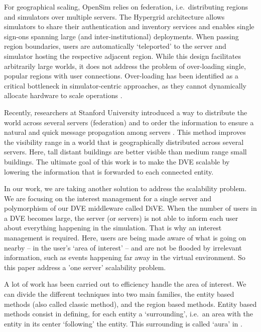 \documentclass[]{elsarticle}
\begin{document}
For geographical scaling, OpenSim relies on federation, i.e.~distributing regions and simulators over multiple servers. The Hypergrid architecture \cite{Lopes.2011} allows simulators to share their authentication and inventory services and enables single sign-ons spanning large (and inter-institutional) deployments. When passing region boundaries, users are automatically `teleported' to the server and simulator hosting the respective adjacent region. While this design facilitates arbitrarily large worlds, it does not address the problem of over-loading single, popular regions with user connections. Over-loading has been identified as a critical bottleneck in simulator-centric approaches, as they cannot dynamically allocate hardware to scale operations \cite{Liu+others.2010}.

Recently, researchers at Stanford University introduced a way to distribute the world across several servers (federation) and to order the information to ensure a natural and quick message propagation among servers \cite{Horn+others.2009,Horn+others.2010,Cheslack-Postava+others.2012}. This method improves the visibility range in a world that is geographically distributed across several servers. Here, tall distant buildings are better visible than medium range small buildings. The ultimate goal of this work is to make the DVE scalable by lowering the information that is forwarded to each connected entity.

In our work, we are taking another solution to address the scalability problem. We are focusing on the interest management for a single server and polymorphism of our DVE middleware called DiVE. When the number of users in a DVE becomes large, the server (or servers) is not able to inform each user about everything happening in the simulation. That is why an interest management is required. Here, users are being made aware of what is going on nearby -- in the user's `area of interest' -- and are not be flooded by irrelevant information, such as events happening far away in the virtual environment. So this paper address a 'one server' scalability problem.

A lot of work has been carried out to efficiency handle the area of interest. We can divide the different techniques into two main families, the entity based methods (also called classic method), and the region based methods.
Entity based methods consist in defining, for each entity a `surrounding', i.e.~an area with the entity in its center `following' the entity. This surrounding is called `aura' in \cite{Benford+Fahlen.1993}.
\end{document}
